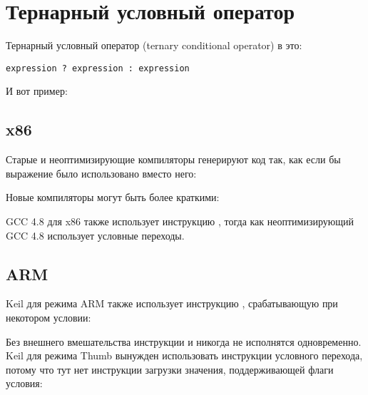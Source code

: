 \section{Тернарный условный оператор}
\label{chap:cond}

Тернарный условный оператор (ternary conditional operator) в \CCpp это:

\begin{lstlisting}
expression ? expression : expression
\end{lstlisting}

И вот пример:



\subsection{x86}

Старые и неоптимизирующие компиляторы генерируют код так, как если бы выражение  было использовано
вместо него:





Новые компиляторы могут быть более краткими:



\Optimizing GCC 4.8 для x86 также использует инструкцию ,
тогда как неоптимизирующий GCC 4.8 использует условные переходы.

\ifdefined\IncludeARM
\subsection{ARM}

\Optimizing Keil для режима ARM также использует инструкцию , срабатывающую при некотором
условии:



Без внешнего вмешательства инструкции  и  никогда не исполнятся одновременно.
\Optimizing Keil для режима Thumb вынужден использовать инструкции условного перехода, потому
что тут нет инструкции загрузки значения, поддерживающей флаги условия:


